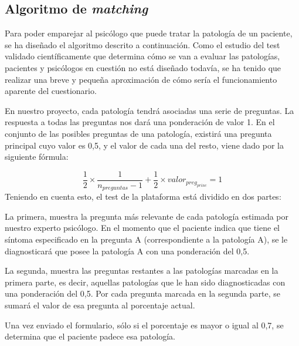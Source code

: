 
\subsection{Algoritmo de \textit{matching}}


Para poder emparejar al psicólogo que puede tratar la patología de un paciente, se ha diseñado el algoritmo descrito a continuación. Como el estudio del test validado científicamente que determina cómo se van a evaluar las patologías, pacientes y psicólogos en cuestión no está diseñado todavía, se ha tenido que realizar una breve y pequeña aproximación de cómo sería el funcionamiento aparente del cuestionario.


En nuestro proyecto, cada patología tendrá asociadas una serie de preguntas. La respuesta a todas las preguntas nos dará una ponderación de valor 1. En el conjunto de las posibles preguntas de una patología, existirá una pregunta principal cuyo valor es 0,5, y el valor de cada una del resto, viene dado por la siguiente fórmula:

\begin{equation}
\frac{1}{2}\times\frac{1}{n_{preguntas}-1}+\frac{1}{2}\times{valor_{preg_{princ}}} = 1
\label{mi_ecuacion}
\end{equation}
%
%
%
%
Teniendo en cuenta esto, el test de la plataforma está dividido en dos partes:


La primera, muestra la pregunta más relevante de cada patología estimada por nuestro experto psicólogo. En el momento que el paciente indica que tiene el síntoma especificado en la pregunta A (correspondiente a la patología A), se le diagnosticará que posee la patología A con una ponderación del 0,5.


La segunda, muestra las preguntas restantes a las patologías marcadas en la primera parte, es decir, aquellas patologías que le han sido diagnosticadas con una ponderación del 0,5. Por cada pregunta marcada en la segunda parte, se sumará el valor de esa pregunta al porcentaje actual.


Una vez enviado el formulario, sólo si el porcentaje es mayor o igual al 0,7, se determina que el paciente padece esa patología.


